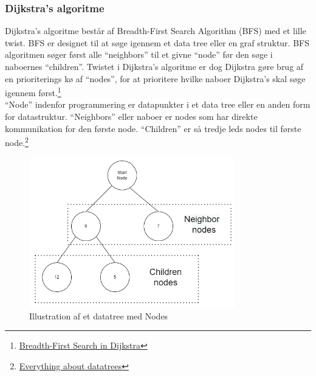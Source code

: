 \documentclass[12pt]{article}
\begin{document}
\subsubsection{Dijkstra's algoritme}
Dijkstra’s algoritme består af Breadth-First Search Algorithm (BFS) med et lille twist. BFS er designet til at søge igennem et data tree eller en graf struktur. BFS algoritmen søger først alle “neighbors” til et givne “node” før den søge i naboernes “children”. Twistet i Dijkstra's algoritme er dog Dijkstra gøre brug af en prioriterings kø af “nodes”, for at prioritere hvilke naboer Dijkstra’s skal søge igennem først.\footnote{\href{https://www.baeldung.com/cs/graph-algorithms-bfs-dijkstra}{Breadth-First Search in Dijkstra}} 
\\“Node” indenfor programmering er datapunkter i et data tree eller en anden form for datastruktur. “Neighbors” eller naboer er nodes som har direkte kommunikation for den første node. “Children” er så tredje leds nodes til første node.\footnote{\href{https://www.freecodecamp.org/news/all-you-need-to-know-about-tree-data-structures-bceacb85490c/}{Everything about datatrees}} 
\begin{figure}[ht]\label{gennemgang af datatree}
  \centering
  \includegraphics[width=0.80\textwidth]{img/nodeSetup.png}
  \caption{Illustration af et datatree med Nodes}
\end{figure}
\newpage
\end{document}
